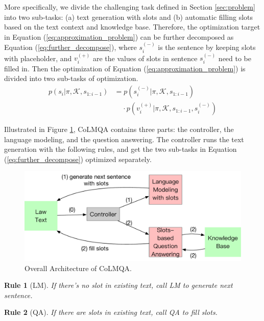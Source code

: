 \documentclass{article}
\newtheorem{controlrule}{Rule}
\begin{document}
More specifically, we divide the challenging task defined in Section \ref{sec:problem} into two sub-tasks: (a) text generation with slots and (b) automatic filling slots based on the text context and knowledge base.
Therefore, the optimization target in Equation (\ref{eq:approximation_problem}) can be further decomposed as Equation (\ref{eq:further_decompose}), where $s_i^{(-)}$ is the sentence by keeping slots with placeholder, and $v_i^{(+)}$ are the values of slots in sentence $s_i^{(-)}$ need to be filled in. 
Then the optimization of Equation (\ref{eq:approximation_problem}) is divided into two sub-tasks of optimization. 
\begin{equation}
\begin{aligned}
p(s_i | \pi, \mathcal{K}, s_{1:i-1}) &= p(s_i^{(-)}|\pi, \mathcal{K}, s_{1:i-1}) \\
& \ \ \ \ \ \cdot p(v_i^{(+)}|\pi, \mathcal{K}, s_{1:i-1}, s_i^{(-)})	
\label{eq:further_decompose}
\end{aligned}
\end{equation}

Illustrated in Figure \ref{fig:overall_architecture}, CoLMQA contains three parts: the controller, the language modeling, and the question answering. 
The controller runs the text generation with the following rules, and get the two sub-tasks in Equation (\ref{eq:further_decompose}) optimized separately.  

\begin{figure}
\centering 
\includegraphics[width=1.0\columnwidth]{img/overall_architecture.pdf} 
\caption{Overall Architecture of CoLMQA.}
\label{fig:overall_architecture} 
\end{figure}

\begin{controlrule}[LM]
If  there's no slot in existing text, call LM to generate next sentence.
\end{controlrule}

\begin{controlrule}[QA]
If there are slots in existing text, call QA to fill slots. 
\end{controlrule}
\end{document}
